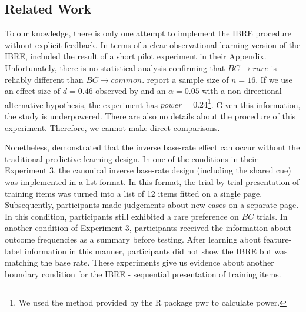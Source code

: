 \documentclass[10pt,letterpaper]{article}
\begin{document}
\subsection{Related Work}

To our knowledge, there is only one attempt to implement the IBRE procedure without explicit feedback.
In terms of a clear observational-learning version of the IBRE,  included the result of a short pilot experiment in their Appendix.
Unfortunately, there is no statistical analysis confirming that $BC \to rare$ is reliably different than $BC \to common$.
 report a sample size of $n = 16$.
If we use an effect size of $d = 0.46$ observed by  and an $\alpha = 0.05$ with a non-directional alternative hypothesis, the experiment has $power = 0.24$\footnote{We used the method provided by the R package pwr \cite{champely2020pwr} to calculate power.}.
Given this information, the study is underpowered.
There are also no details about the procedure of this experiment.
Therefore, we cannot make direct comparisons.

Nonetheless,  demonstrated that the inverse base-rate effect can occur without the traditional predictive learning design.
In one of the conditions in their Experiment 3, the canonical inverse base-rate design (including the shared cue) was implemented in a list format.
In this format, the trial-by-trial presentation of training items was turned into a list of 12 items fitted on a single page.
Subsequently, participants made judgements about new cases on a separate page.
In this condition, participants still exhibited a rare preference on $BC$ trials.
In another condition of Experiment 3, participants received the information about outcome frequencies as a summary before testing.
After learning about feature-label information in this manner, participants did not show the IBRE but was matching the base rate.
These experiments give us evidence about another boundary condition for the IBRE - sequential presentation of training items.
\end{document}
